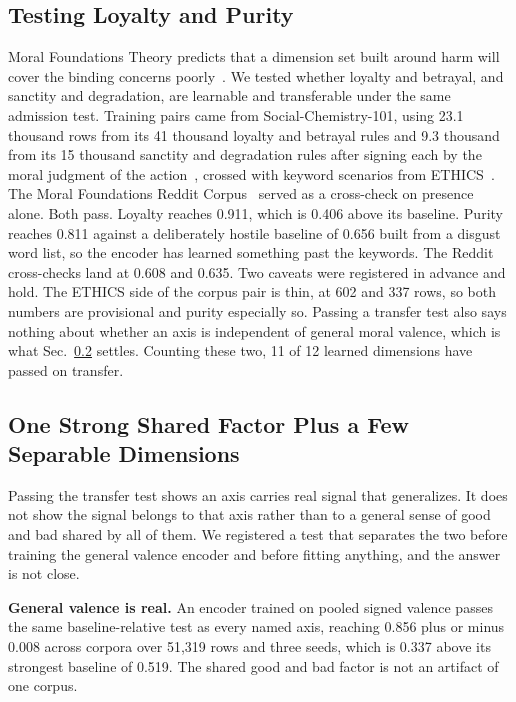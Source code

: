 \documentclass[journal]{IEEEtran}
\begin{document}
\subsection{Testing Loyalty and Purity}
\label{sec:foundations}

Moral Foundations Theory predicts that a dimension set built around harm will
cover the binding concerns poorly~\cite{graham2013moral}. We tested whether
loyalty and betrayal, and sanctity and degradation, are learnable and
transferable under the same admission test. Training pairs came from
Social-Chemistry-101, using 23.1 thousand rows from its 41 thousand loyalty
and betrayal rules and 9.3 thousand from its 15 thousand sanctity and
degradation rules after signing each by the moral judgment of the
action~\cite{forbes2020social}, crossed with keyword scenarios from
ETHICS~\cite{hendrycks2021aligning}. The Moral Foundations Reddit
Corpus~\cite{trager2022moral} served as a cross-check on presence alone. Both
pass. Loyalty reaches 0.911, which is 0.406 above its baseline. Purity
reaches 0.811 against a deliberately hostile baseline of 0.656 built from a
disgust word list, so the encoder has learned something past the keywords.
The Reddit cross-checks land at 0.608 and 0.635. Two caveats were registered
in advance and hold. The ETHICS side of the corpus pair is thin, at 602 and
337 rows, so both numbers are provisional and purity especially so. Passing a
transfer test also says nothing about whether an axis is independent of
general moral valence, which is what Sec.~\ref{sec:bifactor} settles. Counting
these two, 11 of 12 learned dimensions have passed on transfer.

\subsection{One Strong Shared Factor Plus a Few Separable Dimensions}
\label{sec:bifactor}

Passing the transfer test shows an axis carries real signal that generalizes.
It does not show the signal belongs to that axis rather than to a general
sense of good and bad shared by all of them. We registered a test that
separates the two before training the general valence encoder and before
fitting anything, and the answer is not close.

\textbf{General valence is real.} An encoder trained on pooled signed valence
passes the same baseline-relative test as every named axis, reaching 0.856
plus or minus 0.008 across corpora over 51,319 rows and three seeds, which is
0.337 above its strongest baseline of 0.519. The shared good and bad factor
is not an artifact of one corpus.
\end{document}
